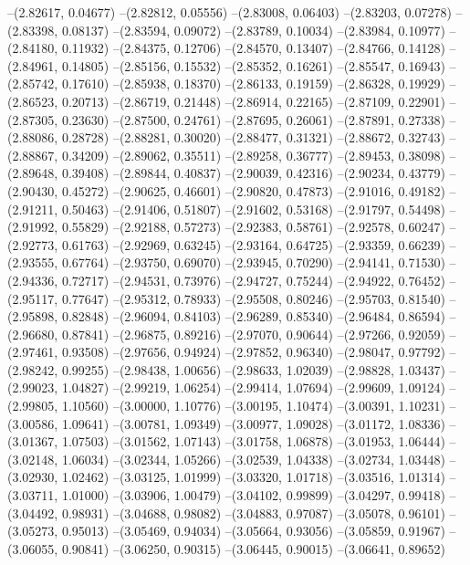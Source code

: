 --(2.82617, 0.04677)
--(2.82812, 0.05556)
--(2.83008, 0.06403)
--(2.83203, 0.07278)
--(2.83398, 0.08137)
--(2.83594, 0.09072)
--(2.83789, 0.10034)
--(2.83984, 0.10977)
--(2.84180, 0.11932)
--(2.84375, 0.12706)
--(2.84570, 0.13407)
--(2.84766, 0.14128)
--(2.84961, 0.14805)
--(2.85156, 0.15532)
--(2.85352, 0.16261)
--(2.85547, 0.16943)
--(2.85742, 0.17610)
--(2.85938, 0.18370)
--(2.86133, 0.19159)
--(2.86328, 0.19929)
--(2.86523, 0.20713)
--(2.86719, 0.21448)
--(2.86914, 0.22165)
--(2.87109, 0.22901)
--(2.87305, 0.23630)
--(2.87500, 0.24761)
--(2.87695, 0.26061)
--(2.87891, 0.27338)
--(2.88086, 0.28728)
--(2.88281, 0.30020)
--(2.88477, 0.31321)
--(2.88672, 0.32743)
--(2.88867, 0.34209)
--(2.89062, 0.35511)
--(2.89258, 0.36777)
--(2.89453, 0.38098)
--(2.89648, 0.39408)
--(2.89844, 0.40837)
--(2.90039, 0.42316)
--(2.90234, 0.43779)
--(2.90430, 0.45272)
--(2.90625, 0.46601)
--(2.90820, 0.47873)
--(2.91016, 0.49182)
--(2.91211, 0.50463)
--(2.91406, 0.51807)
--(2.91602, 0.53168)
--(2.91797, 0.54498)
--(2.91992, 0.55829)
--(2.92188, 0.57273)
--(2.92383, 0.58761)
--(2.92578, 0.60247)
--(2.92773, 0.61763)
--(2.92969, 0.63245)
--(2.93164, 0.64725)
--(2.93359, 0.66239)
--(2.93555, 0.67764)
--(2.93750, 0.69070)
--(2.93945, 0.70290)
--(2.94141, 0.71530)
--(2.94336, 0.72717)
--(2.94531, 0.73976)
--(2.94727, 0.75244)
--(2.94922, 0.76452)
--(2.95117, 0.77647)
--(2.95312, 0.78933)
--(2.95508, 0.80246)
--(2.95703, 0.81540)
--(2.95898, 0.82848)
--(2.96094, 0.84103)
--(2.96289, 0.85340)
--(2.96484, 0.86594)
--(2.96680, 0.87841)
--(2.96875, 0.89216)
--(2.97070, 0.90644)
--(2.97266, 0.92059)
--(2.97461, 0.93508)
--(2.97656, 0.94924)
--(2.97852, 0.96340)
--(2.98047, 0.97792)
--(2.98242, 0.99255)
--(2.98438, 1.00656)
--(2.98633, 1.02039)
--(2.98828, 1.03437)
--(2.99023, 1.04827)
--(2.99219, 1.06254)
--(2.99414, 1.07694)
--(2.99609, 1.09124)
--(2.99805, 1.10560)
--(3.00000, 1.10776)
--(3.00195, 1.10474)
--(3.00391, 1.10231)
--(3.00586, 1.09641)
--(3.00781, 1.09349)
--(3.00977, 1.09028)
--(3.01172, 1.08336)
--(3.01367, 1.07503)
--(3.01562, 1.07143)
--(3.01758, 1.06878)
--(3.01953, 1.06444)
--(3.02148, 1.06034)
--(3.02344, 1.05266)
--(3.02539, 1.04338)
--(3.02734, 1.03448)
--(3.02930, 1.02462)
--(3.03125, 1.01999)
--(3.03320, 1.01718)
--(3.03516, 1.01314)
--(3.03711, 1.01000)
--(3.03906, 1.00479)
--(3.04102, 0.99899)
--(3.04297, 0.99418)
--(3.04492, 0.98931)
--(3.04688, 0.98082)
--(3.04883, 0.97087)
--(3.05078, 0.96101)
--(3.05273, 0.95013)
--(3.05469, 0.94034)
--(3.05664, 0.93056)
--(3.05859, 0.91967)
--(3.06055, 0.90841)
--(3.06250, 0.90315)
--(3.06445, 0.90015)
--(3.06641, 0.89652)
